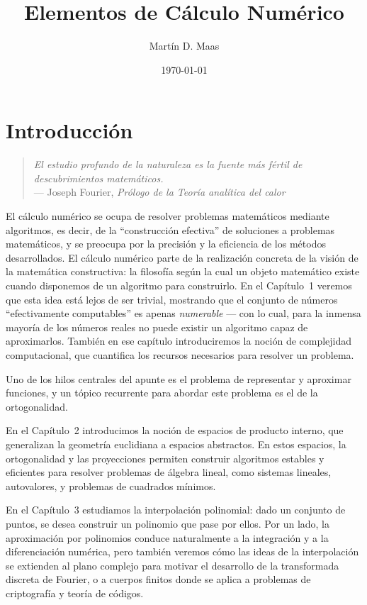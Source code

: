 \documentclass[a4paper,11pt]{report}
\title{Elementos de Cálculo Numérico}
\author{Martín D. Maas}
\date{\today}
\begin{document}
\maketitle

\tableofcontents

\chapter*{Introducción}

\begin{quote}
\textit{El estudio profundo de la naturaleza es la fuente más fértil de descubrimientos matemáticos.}\\
\hfill --- Joseph Fourier, \textit{Prólogo de la Teoría analítica del calor}
\end{quote}

\vspace{1em}

El cálculo numérico se ocupa de resolver problemas matemáticos mediante algoritmos, es decir, de la ``construcción efectiva'' de soluciones a problemas matemáticos, y se preocupa por la precisión y la eficiencia de los métodos desarrollados.
El cálculo numérico parte de la realización concreta de la visión de la matemática constructiva: la filosofía según la cual un objeto matemático existe cuando disponemos de un algoritmo para construirlo. En el Capítulo~1 veremos que esta idea está lejos de ser trivial, mostrando que el conjunto de números ``efectivamente computables'' es apenas \textit{numerable} --- con lo cual, para la inmensa mayoría de los números reales no puede existir un algoritmo capaz de aproximarlos. También en ese capítulo introduciremos la noción de complejidad computacional, que cuantifica los recursos necesarios para resolver un problema.

Uno de los hilos centrales del apunte es el problema de representar y aproximar funciones, y un tópico recurrente para abordar este problema es el de la ortogonalidad.

En el Capítulo~2 introducimos la noción de espacios de producto interno, que generalizan la geometría euclidiana a espacios abstractos. En estos espacios, la ortogonalidad y las proyecciones permiten construir algoritmos estables y eficientes para resolver problemas de álgebra lineal, como sistemas lineales, autovalores, y problemas de cuadrados mínimos.

En el Capítulo~3 estudiamos la interpolación polinomial: dado un conjunto de puntos, se desea construir un polinomio que pase por ellos. Por un lado, la aproximación por polinomios conduce naturalmente a la integración y a la diferenciación numérica, pero también veremos cómo las ideas de la interpolación se extienden al plano complejo para motivar el desarrollo de la transformada discreta de Fourier, o a cuerpos finitos donde se aplica a problemas de criptografía y teoría de códigos.
\end{document}
